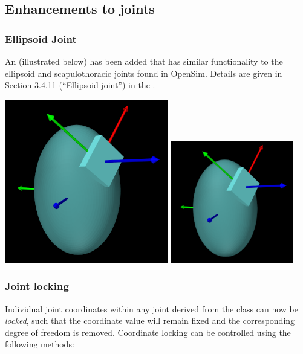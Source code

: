 \documentclass{article}
\begin{document}
\subsection*{Enhancements to joints}

\subsubsection{Ellipsoid Joint}	

An  (illustrated
below) has been added that has similar functionality to the ellipsoid
and scapulothoracic joints found in OpenSim. Details are given in
Section 3.4.11 (``Ellipsoid joint'') in the
.

%
\begin{center}
\iflatexml
 \includegraphics[]{../modelguide/images/EllipsoidJointDemo}
\else
 \includegraphics[width=0.4\textwidth]{../modelguide/images/EllipsoidJointDemo}
\fi
\end{center}
%

\subsubsection{Joint locking}

Individual joint coordinates within any joint derived from the
 class can now be {\it
locked}, such that the coordinate value will remain fixed and the
corresponding degree of freedom is removed. Coordinate locking can be
controlled using the following methods:
\end{document}
